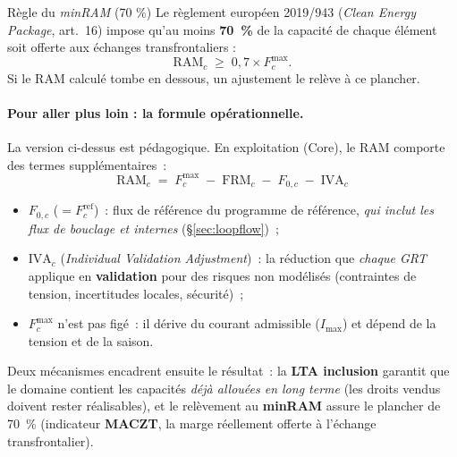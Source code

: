 \documentclass[11pt,a4paper]{article}
\newcommand{\RAM}{\mathrm{RAM}}
\newcommand{\Fmax}{F^{\max}}
\newcommand{\Fref}{F^{\mathrm{ref}}}
\newcommand{\FRM}{\mathrm{FRM}}
\begin{document}
\begin{center}
\end{center}

\begin{rembox}{Règle du \textit{minRAM} (70 \%)}
Le règlement européen 2019/943 (\emph{Clean Energy Package}, art.~16) impose
qu'au moins \textbf{70~\%} de la capacité de chaque élément soit offerte aux
échanges transfrontaliers :
\[
  \RAM_c \;\ge\; 0{,}7 \times \Fmax_c .
\]
Si le RAM calculé tombe en dessous, un ajustement le relève à ce plancher.
\end{rembox}

\paragraph{Pour aller plus loin : la formule opérationnelle.} La version
ci-dessus est pédagogique. En exploitation (Core), le RAM comporte des termes
supplémentaires~:
\[
  \boxed{\;\RAM_c \;=\; \Fmax_c \;-\; \FRM_c \;-\; F_{0,c} \;-\; \mathrm{IVA}_c\;}
\]
\begin{itemize}[nosep,leftmargin=1.4em]
  \item $F_{0,c}$ ($=\Fref_c$)~: flux de référence du programme de référence,
        \emph{qui inclut les flux de bouclage et internes} (\S\ref{sec:loopflow})~;
  \item $\mathrm{IVA}_c$ (\emph{Individual Validation Adjustment})~: la
        réduction que \emph{chaque GRT} applique en \textbf{validation} pour
        des risques non modélisés (contraintes de tension, incertitudes
        locales, sécurité)~;
  \item $\Fmax_c$ n'est pas figé~: il dérive du courant admissible
        ($I_{\max}$) et dépend de la tension et de la saison.
\end{itemize}
Deux mécanismes encadrent ensuite le résultat~: la \textbf{LTA inclusion}
garantit que le domaine contient les capacités \emph{déjà allouées en long
terme} (les droits vendus doivent rester réalisables), et le relèvement au
\textbf{minRAM} assure le plancher de 70~\% (indicateur \textbf{MACZT}, la marge
réellement offerte à l'échange transfrontalier).
\end{document}
